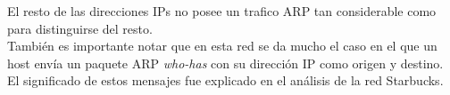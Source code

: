 El resto de las direcciones IPs no posee un trafico ARP tan considerable como para distinguirse del resto.\\
También es importante notar que en esta red se da mucho el caso en el que un host envía un paquete ARP \textit{who-has} con su dirección IP como origen y destino. El significado de estos mensajes fue explicado en el análisis de la red Starbucks.

\newpage